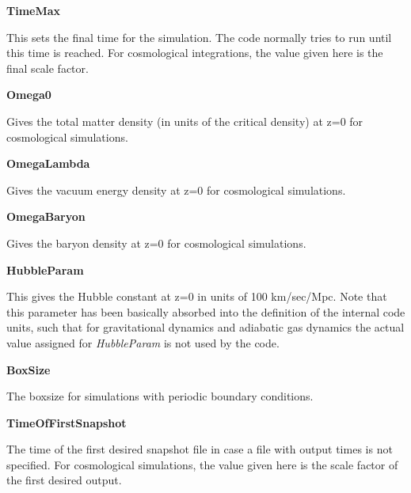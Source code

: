 \begin{DoxyItemize}
\item {\bfseries \-Time\-Max} \par
 \-This sets the final time for the simulation. \-The code normally tries to run until this time is reached. \-For cosmological integrations, the value given here is the final scale factor.
\end{DoxyItemize}


\begin{DoxyItemize}
\item {\bfseries \-Omega0} \par
 \-Gives the total matter density (in units of the critical density) at z=0 for cosmological simulations.
\end{DoxyItemize}


\begin{DoxyItemize}
\item {\bfseries \-Omega\-Lambda} \par
 \-Gives the vacuum energy density at z=0 for cosmological simulations.
\end{DoxyItemize}


\begin{DoxyItemize}
\item {\bfseries \-Omega\-Baryon} \par
 \-Gives the baryon density at z=0 for cosmological simulations.
\end{DoxyItemize}


\begin{DoxyItemize}
\item {\bfseries \-Hubble\-Param} \par
 \-This gives the \-Hubble constant at z=0 in units of 100 km/sec/\-Mpc. \-Note that this parameter has been basically absorbed into the definition of the internal code units, such that for gravitational dynamics and adiabatic gas dynamics the actual value assigned for {\itshape \-Hubble\-Param\/} is not used by the code.
\end{DoxyItemize}


\begin{DoxyItemize}
\item {\bfseries \-Box\-Size} \par
 \-The boxsize for simulations with periodic boundary conditions.
\end{DoxyItemize}


\begin{DoxyItemize}
\item {\bfseries \-Time\-Of\-First\-Snapshot} \par
 \-The time of the first desired snapshot file in case a file with output times is not specified. \-For cosmological simulations, the value given here is the scale factor of the first desired output.
\end{DoxyItemize}


